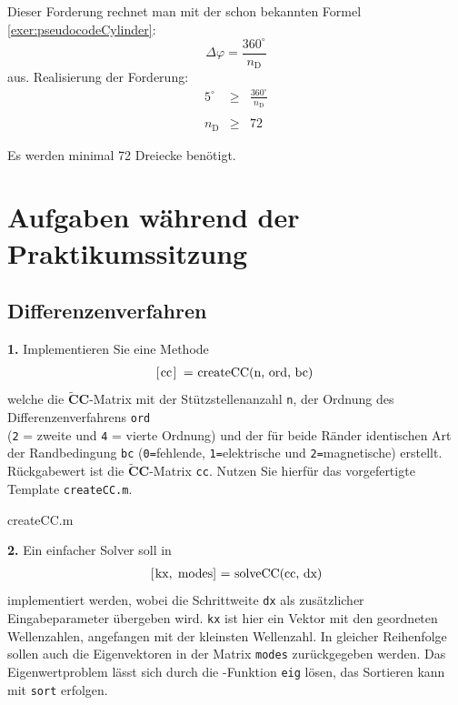 \documentclass[Protokollheft.tex]{subfiles}
\begin{document}
	Dieser Forderung rechnet man mit der schon bekannten Formel
	 \ref{exer:pseudocodeCylinder}:
		$$\Delta \varphi = \frac{360^\circ}{n_\text{D}}$$ aus. 
	Realisierung der Forderung:
	\begin{eqnarray*}
		5^{\circ} &\geq& \frac{360^\circ}{n_\text{D}}\\
		\\
		n_\text{D} &\geq& 72
	\end{eqnarray*}

	Es werden minimal 72 Dreiecke benötigt.

\section{Aufgaben während der Praktikumssitzung}
{\subsection{Differenzenverfahren}}

        \begin{framed}
	\noindent \textbf{1.} Implementieren Sie eine Methode
                    \begin{align}
                        \lstinline{[cc] = createCC(n, ord, bc)}\; \label{meth:createCC}
                    \end{align}     
                    welche die $\tilde{\textbf{C}}\textbf{C}$-Matrix mit der Stützstellenanzahl \lstinline{n}, der Ordnung des Differenzenverfahrens
                    \lstinline{ord}\\ (\lstinline{2} = zweite und \lstinline{4} = vierte Ordnung) und der für beide Ränder identischen Art der Randbedingung \lstinline{bc} (\lstinline{0=}fehlende, \lstinline{1=}elektrische und  \lstinline{2=}magnetische) erstellt.
                    Rückgabewert ist die $\tilde{\textbf{C}}\textbf{C}$-Matrix \lstinline{cc}. Nutzen Sie hierfür das vorgefertigte Template \lstinline{createCC.m}.\label{exer:createCC}
\end{framed}

 {createCC.m}

        \begin{framed}
	\noindent \textbf{2.} Ein einfacher Solver soll in
                    \begin{align}
                        \lstinline{[kx, modes] = solveCC(cc, dx)} \label{meth:solveCC}
                    \end{align}
                    implementiert werden, wobei die Schrittweite \lstinline{dx} als zusätzlicher Eingabeparameter übergeben wird.
                    \lstinline{kx} ist hier ein Vektor mit den geordneten Wellenzahlen, angefangen mit der kleinsten Wellenzahl. In gleicher
                    Reihenfolge sollen auch die Eigenvektoren in der Matrix \lstinline{modes} zurückgegeben werden.
                    Das Eigenwertproblem lässt sich durch die \matlab-Funktion \lstinline{eig} lösen, das Sortieren kann mit \lstinline{sort} erfolgen.\label{exer:solveCC}
\end{framed}
\end{document}
